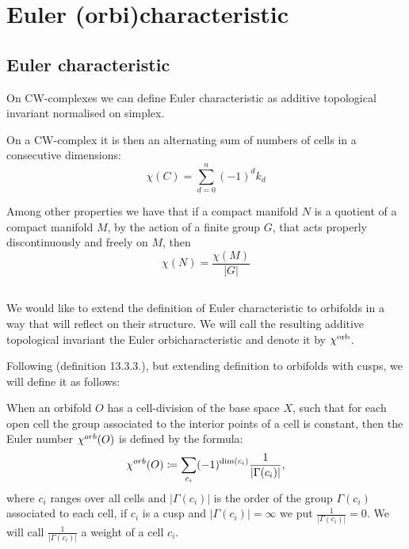 

\section{Euler (orbi)characteristic}\label{E_orb}
\label{\Eoc_as_a_sum}
\subsection{Euler characteristic}
On CW-complexes we can define Euler characteristic as additive topological invariant 
normalised on simplex.

On a CW-complex it is then an alternating sum of numbers of cells in 
a consecutive dimensions: 
\begin{equation}
\chi(C) = \sum_{d = 0}^n (-1)^d k_d
\end{equation}

Among other properties we have that if a compact manifold $N$ is a quotient of a compact 
manifold $M$, 
by the action of a finite group $G$, that acts properly discontinuously and freely on $M$, then
\begin{equation}
\chi(N) = \frac{\chi(M)}{|G|}
\end{equation}   


\subsection{\Eoc}\label{Eoc}\label{extended_Euler_orbicharacteristic}
We would like to extend the definition of Euler characteristic to orbifolds in a way 
that will reflect on their structure. 
We will call the resulting additive topological invariant the Euler orbicharacteristic 
and denote it by $\chi^{\rm orb}$.


Following \cite{Thurston1979} (definition 13.3.3.), but extending 
definition to orbifolds with cusps, we will define it as follows:
\begin{definition}
When an orbifold $O$ has a cell-division of the base space $X$, such that for each
open cell the group associated to
the interior points of a cell is constant, then the Euler number ${\chi^{orb}(O)}$ is defined by
the formula:
\begin{equation}
{\chi^{orb}(O)} \coloneqq \sum_{c_i} (-1)^{ \mathrm{dim}(c_i)}\frac{1}{|\Gamma(c_i)|},
\end{equation}
where $c_i$ ranges over all cells and $|\Gamma(c_i)|$ is the order of the group $\Gamma(c_i)$ 
associated to each cell, if $c_i$ is a cusp and $|\Gamma(c_i)| = \infty$ we put 
$\frac{1}{|\Gamma(c_i)|} = 0$. We will call $\frac{1}{|\Gamma(c_i)|}$ a weight of a cell $c_i$.
\end{definition} 

